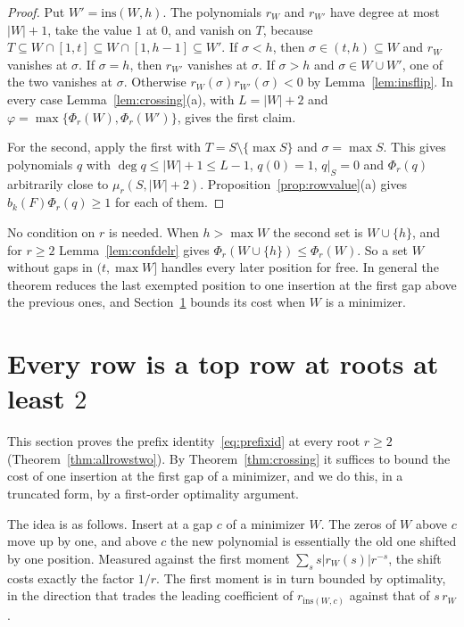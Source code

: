 \documentclass[11pt]{article}
\begin{document}
\begin{proof}
Put $W'=\mathrm{ins}(W,h)$.  The polynomials $r_W$ and $r_{W'}$ have degree
at most $|W|+1$, take the value $1$ at $0$, and vanish on $T$, because
$T\subseteq W\cap[1,t]\subseteq W\cap[1,h-1]\subseteq W'$.  If $\sigma<h$,
then $\sigma\in(t,h)\subseteq W$ and $r_W$ vanishes at $\sigma$.  If
$\sigma=h$, then $r_{W'}$ vanishes at $\sigma$.  If $\sigma>h$ and
$\sigma\in W\cup W'$, one of the two vanishes at $\sigma$.  Otherwise
$r_W(\sigma)r_{W'}(\sigma)<0$ by Lemma~\ref{lem:insflip}.  In every case
Lemma~\ref{lem:crossing}(a), with $L=|W|+2$ and
$\varphi=\max\{\Phi_r(W),\Phi_r(W')\}$, gives the first claim.

For the second, apply the first with $T=S\setminus\{\max S\}$ and
$\sigma=\max S$.  This gives polynomials $q$ with $\deg q\le|W|+1\le L-1$,
$q(0)=1$, $q|_S=0$ and $\Phi_r(q)$ arbitrarily close to
$\mu_r(S,|W|+2)$.  Proposition~\ref{prop:rowvalue}(a) gives
$b_k(F)\Phi_r(q)\ge1$ for each of them.
\end{proof}

No condition on $r$ is needed.  When $h>\max W$ the second set is
$W\cup\{h\}$, and for $r\ge2$ Lemma~\ref{lem:confdelr} gives
$\Phi_r(W\cup\{h\})\le\Phi_r(W)$.  So a set $W$ without gaps in
$(t,\max W]$ handles every later position for free.  In general the theorem
reduces the last exempted position to one insertion at the first gap above
the previous ones, and Section~\ref{sec:allrowstwo} bounds its cost when
$W$ is a minimizer.

\section{Every row is a top row at roots at least \texorpdfstring{$2$}{2}}\label{sec:allrowstwo}

This section proves the prefix identity~\eqref{eq:prefixid} at every root $r\ge2$
(Theorem~\ref{thm:allrowstwo}).  By Theorem~\ref{thm:crossing} it suffices
to bound the cost of one insertion at the first gap of a minimizer, and we
do this, in a truncated form, by a first-order optimality argument.

The idea is as follows.  Insert at a gap $c$ of a minimizer $W$.  The zeros of $W$
above $c$ move up by one, and above $c$ the new polynomial is essentially
the old one shifted by one position.  Measured against the first moment
$\sum_ss|r_W(s)|r^{-s}$, the shift costs exactly the factor $1/r$.  The
first moment is in turn bounded by optimality, in the direction that trades
the leading coefficient of $r_{\mathrm{ins}(W,c)}$ against that of $s\,r_W$.
\end{document}
